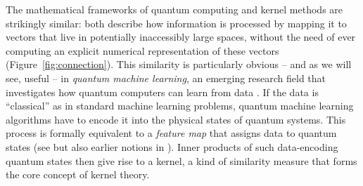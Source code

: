 \documentclass[aps, reprint, onecolumn, nofootinbib, longbibliography]{revtex4-2}
\begin{document}
The mathematical frameworks of quantum computing and kernel methods are strikingly similar: both describe how information is processed by mapping it to vectors that live in potentially inaccessibly large spaces, without the need of ever computing an explicit numerical representation of these vectors (Figure~\ref{fig:connection}). This similarity is particularly obvious -- and as we will see, useful -- in \textit{quantum machine learning}, an emerging research field that investigates how quantum computers can learn from data \citep{wittek2014quantum, biamonte2017quantum, schuld2018supervised}. If the data is ``classical'' as in standard machine learning problems, quantum machine learning algorithms have to encode it into the physical states of quantum systems. This process is formally equivalent to a \textit{feature map} that assigns data to quantum states (see \cite{schuld2019quantum, havlivcek2019supervised} but also earlier notions in \cite{rebentrost2014quantum, chatterjee2016generalized, schuld2018circuit}). Inner products of such data-encoding quantum states then give rise to a kernel, a kind of similarity measure that forms the core concept of kernel theory.  
\end{document}

